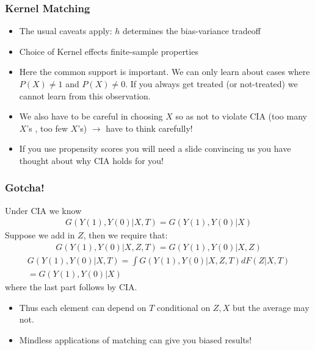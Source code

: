 \documentclass[xcolor=pdftex,dvipsnames,table,mathserif,aspectratio=169]{beamer}
\begin{document}
\begin{frame}
\frametitle{Kernel Matching}
\begin{itemize}
\item The usual caveats apply: $h$ determines the \alert{bias-variance} tradeoff
\item Choice of Kernel effects finite-sample properties
\item Here the \alert{common support} is important. We can only learn about cases where $P(X) \neq 1$ and $P(X) \neq 0$. If you always get treated (or not-treated) we cannot learn from this observation.
\item We also have to be careful in choosing $X$ so as not to violate CIA (too many $X$'s , too few $X$'s) $\rightarrow$ have to think carefully!
\item If you use propensity scores you will need a slide convincing us you have thought about why CIA holds for you!
\end{itemize}
\end{frame}



\begin{frame}
\frametitle{Gotcha!}
\small
Under CIA we know
\begin{eqnarray*}
G(Y(1),Y(0) | X, T) = G(Y(1),Y(0) | X)
\end{eqnarray*}
Suppose we add in $Z$, then we require that:
\begin{eqnarray*}
G(Y(1),Y(0) | X, Z, T) = G(Y(1),Y(0) | X, Z)
\end{eqnarray*}
\begin{eqnarray*}
G(Y(1),Y(0) | X, T) = \int G(Y(1),Y(0) | X, Z, T) dF(Z | X,T) \\
= G(Y(1),Y(0) | X)
\end{eqnarray*}
where the last part follows by CIA.
\begin{itemize}
\item Thus each element can depend on $T$ conditional on $Z,X$ but the average may not.
\item Mindless applications of matching can give you biased results!
\end{itemize}
\end{frame}
\end{document}
